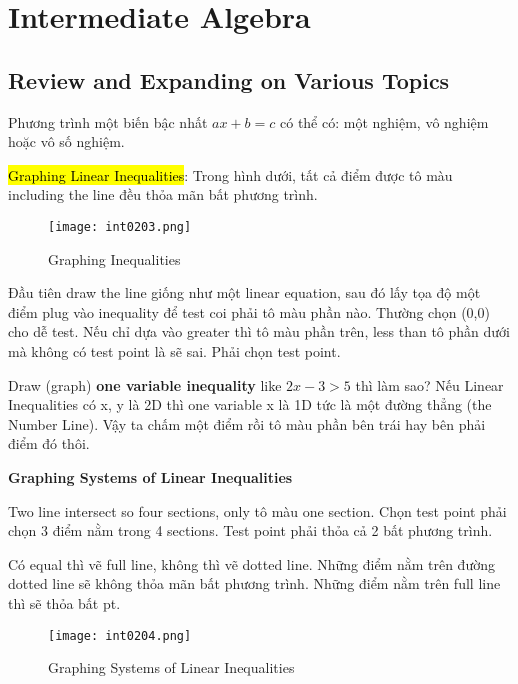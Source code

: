\chapter{Intermediate Algebra}

\section{Review and Expanding on Various Topics}

Phương trình một biến bậc nhất $ax+b=c$ có thể có: một nghiệm, vô nghiệm hoặc vô số nghiệm.

\vspace{.5cm}

\hl{Graphing Linear Inequalities}: Trong hình dưới, tất cả điểm được tô màu including the line đều thỏa mãn bất phương trình.

\begin{figure}[htb!]
  \centering
  \texttt{[image: int0203.png]}
  \caption{Graphing Inequalities}
\end{figure}

Đầu tiên draw the line giống như một linear equation, sau đó lấy tọa độ một điểm plug vào inequality để test coi phải tô màu phần nào. Thường chọn (0,0) cho dễ test. Nếu chỉ dựa vào greater thì tô màu phần trên, less than tô phần dưới mà không có test point là sẽ sai. Phải chọn test point.

\vspace{.5cm}

Draw (graph) \textbf{one variable inequality} like $2x-3>5$ thì làm sao? Nếu Linear Inequalities có x, y là 2D thì one variable x là 1D tức là một đường thẳng (the Number Line). Vậy ta chấm một điểm rồi tô màu phần bên trái hay bên phải điểm đó thôi.

\vspace{0.6 cm}

\centerline{\textbf{\Large Graphing Systems of Linear Inequalities}}

\vspace{0.3 cm}

Two line intersect so four sections, only tô màu one section. Chọn test point phải chọn 3 điểm nằm trong 4 sections. Test point phải thỏa cả 2 bất phương trình.

Có equal thì vẽ full line, không thì vẽ dotted line. Những điểm nằm trên đường dotted line sẽ không thỏa mãn bất phương trình. Những điểm nằm trên full line thì sẽ thỏa bất pt.

\begin{figure}[htb!]
  \centering
  \texttt{[image: int0204.png]}
  \caption{Graphing Systems of Linear Inequalities}
\end{figure}

